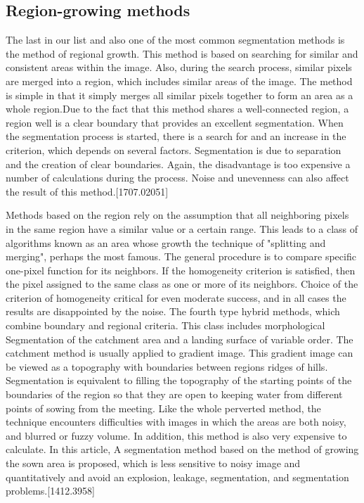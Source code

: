 \subsection{Region-growing methods}\label{sec:3.4.6}
\par The last in our list and also one of the most common segmentation methods is the method of regional growth. This method is based on searching for similar and consistent areas within the image. Also, during the search process, similar pixels are merged into a region, which includes similar areas of the image. The method is simple in that it simply merges all similar pixels together to form an area as a whole region.Due to the fact that this method shares a well-connected region, a region well is a clear boundary that provides an excellent segmentation. When the segmentation process is started, there is a search for and an increase in the criterion, which depends on several factors. Segmentation is due to separation and the creation of clear boundaries. Again, the disadvantage is too expensive a number of calculations during the process. Noise and unevenness can also affect the result of this method.[1707.02051]

\par Methods based on the region rely on the assumption that all neighboring pixels in the same region have a similar value or a certain range. This leads to a class of algorithms known as an area whose growth the technique of "splitting and merging", perhaps the most famous. The general procedure is to compare specific one-pixel function for its neighbors. If the homogeneity criterion is satisfied, then the pixel assigned to the same class as one or more of its neighbors. Choice of the criterion of homogeneity critical for even moderate success, and in all cases the results are disappointed by the noise. The fourth type hybrid methods, which combine boundary and regional criteria. This class includes morphological Segmentation of the catchment area and a landing surface of variable order. The catchment method is usually applied to gradient image. This gradient image can be viewed as a topography with boundaries between regions ridges of hills. Segmentation is equivalent to filling the topography of the starting points of the boundaries of the region so that they are open to keeping water from different points of sowing from the meeting. Like the whole perverted method, the technique encounters difficulties with images in which the areas are both noisy, and blurred or fuzzy volume. In addition, this method is also very expensive to calculate. In this article, A segmentation method based on the method of growing the sown area is proposed, which is less sensitive to noisy image and quantitatively and avoid an explosion, leakage, segmentation, and segmentation problems.[1412.3958]




